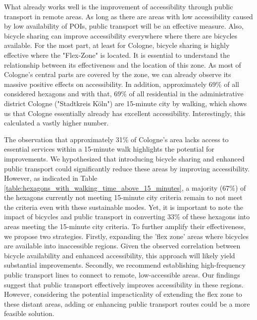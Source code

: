 What already works well is the improvement of accessibility through public transport in remote areas.
As long as there are areas with low accessibility caused by low availability of POIs, public transport will be an effective measure.
Also, bicycle sharing can improve accessibility everywhere where there are bicycles available.
For the most part, at least for Cologne, bicycle sharing is highly effective where the "Flex-Zone" is located.
It is essential to understand the relationship between its effectiveness and the location of this zone.
As most of Cologne's central parts are covered by the zone, we can already observe its massive positive effects on accessibility.
In addition, approximately 69\% of all considered hexagons and with that, 69\% of all residential in the administrative district Cologne ("Stadtkreis Köln") are 15-minute city by walking, which shows us that Cologne essentially already has excellent accessibility.
Interestingly, this  calculated a vastly higher number. 

The observation that approximately 31\% of Cologne's area lacks access to essential services within a 15-minute walk highlights the potential for improvements.
We hypothesized that introducing bicycle sharing and enhanced public transport could significantly reduce these areas by improving accessibility.
However, as indicated in Table \ref{table:hexagons_with_walking_time_above_15_minutes}, a majority (67\%) of the hexagons currently not meeting 15-minute city criteria remain to not meet the criteria even with these sustainable modes.
Yet, it is important to note the impact of bicycles and public transport in converting 33\% of these hexagons into areas meeting the 15-minute city criteria.
To further amplify their effectiveness, we propose two strategies.
Firstly, expanding the 'flex zone' areas where bicycles are available into inaccessible regions. 
Given the observed correlation between bicycle availability and enhanced accessibility, this approach will likely yield substantial improvements.
Secondly, we recommend establishing high-frequency public transport lines to connect to remote, low-accessible areas. 
Our findings suggest that public transport effectively improves accessibility in these regions. 
However, considering the potential impracticality of extending the flex zone to these distant areas, adding or enhancing public transport routes could be a more feasible solution.

